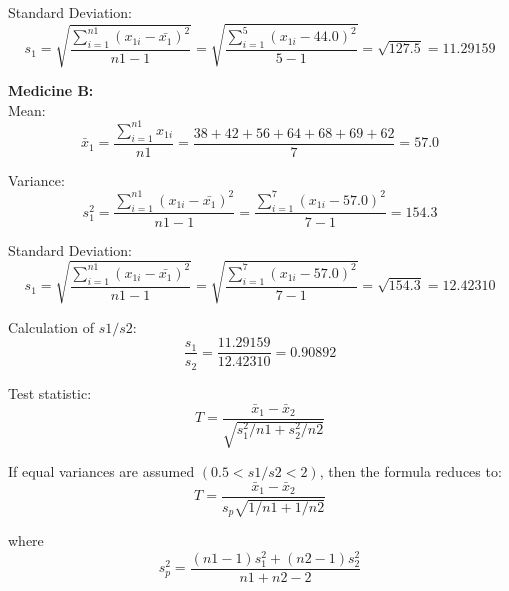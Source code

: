 \documentclass[a4paper,11pt,openright]{report}
\begin{document}
\begin{enumerate}
\hspace*{10mm} Standard Deviation:
\begin{equation*}
s_{1} = \sqrt{\frac{\sum\limits_{i=1}^{n1} (x_{1i} - \bar {x_{1}})^{2}}{n1 - 1}}
	= \sqrt{\frac{\sum\limits_{i=1}^{5} (x_{1i} - 44.0)^{2}}{5 -1}}
	= \sqrt{127.5} = 11.29159
\end{equation*}

\vspace{1cm}

\textbf{Medicine B:} \\
\hspace*{10mm} Mean:
\begin{equation*}
\bar x_{1} = \frac{\sum\limits_{i=1}^{n1} x_{1i}}{n1}
		= \frac{38 + 42 + 56 + 64 + 68 + 69 + 62}{7} = 57.0
\end{equation*}

\hspace*{10mm} Variance:
\begin{equation*}
s_{1}^{2} = \frac{\sum\limits_{i=1}^{n1} (x_{1i} - \bar {x_{1}})^{2}}{n1 - 1}
	= \frac{\sum\limits_{i=1}^{7} (x_{1i} - 57.0)^{2}}{7 - 1} = 154.3
\end{equation*}

\hspace*{10mm} Standard Deviation:
\begin{equation*}
s_{1} = \sqrt{\frac{\sum\limits_{i=1}^{n1} (x_{1i} - \bar {x_{1}})^{2}}{n1 - 1}}
	= \sqrt{\frac{\sum\limits_{i=1}^{7} (x_{1i} - 57.0)^{2}}{7 -1}}
	= \sqrt{154.3} = 12.42310
\end{equation*}

Calculation of $s1/s2$:
\begin{equation*}
\frac{s_{1}}{s_{2}} = \frac{11.29159}{12.42310} = 0.90892
\end{equation*}

Test statistic:
\begin{equation*}
T = \frac{\bar x_{1} - \bar x_{2}}{\sqrt{s_{1}^{2}/n1 + s_{2}^{2}/n2}}
\end{equation*}

If equal variances are assumed $(0.5 < s1/s2 < 2)$, then the formula reduces to:
\begin{equation*}
T = \frac{\bar x_{1} - \bar x_{2}}{s_{p} \sqrt{1/n1 + 1/n2}}
\end{equation*}

where
\begin{equation*}
s_{p}^{2} = \frac{(n1-1)s_{1}^{2} + (n2-1)s_{2}^{2}}{n1+n2-2}
\end{equation*}


\end{enumerate}
\end{document}
